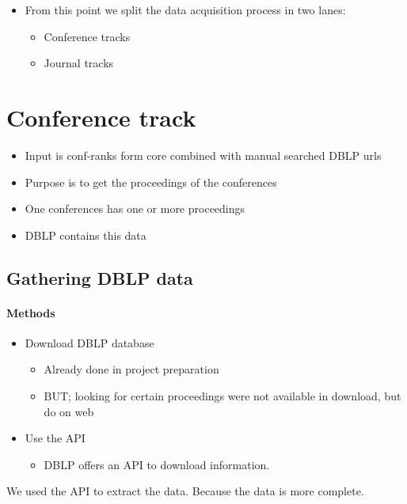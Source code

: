 {\begin{itemize}
    \paragraph{Completeness}
    Core conference data:
    \begin{itemize}
        \item 883 rows in total, within scope (because of rank): 486
        \item No DBLP link for 24 conferences within our ranking focus.
        \item To get this data we manually looked up the dblp url and added this data to the database. We were able to to find the dblp urls of 17 conferences, which remains 7 unknown
    \end{itemize}
    
    
    \item From this point we split the data acquisition process in two lanes:
    \begin{itemize}
        \item Conference tracks
        \item Journal tracks
    \end{itemize}
    
    
\end{itemize}


\section{Conference track}
\begin{itemize}
    \item Input is conf-ranks form core combined with manual searched DBLP urls
    \item Purpose is to get the proceedings of the conferences
    \item One conferences has one or more proceedings
    \item DBLP contains this data
\end{itemize}

\subsection{Gathering DBLP data}
\paragraph{Methods}
\begin{itemize}
    \item Download DBLP database
    \begin{itemize}
        \item Already done in project preparation
        \item BUT; looking for certain proceedings were not available in download, but do on web
    \end{itemize}
    \item Use the API
    \begin{itemize}
        \item DBLP offers an API to download information.
    \end{itemize}
\end{itemize}
We used the API to extract the data. Because the data is more complete.

}
